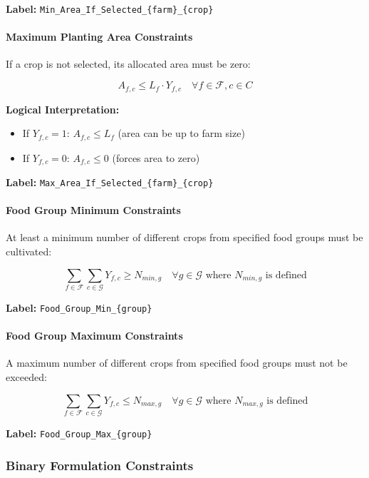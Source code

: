 \documentclass{article}
\begin{document}
\textbf{Label:} \texttt{Min\_Area\_If\_Selected\_\{farm\}\_\{crop\}}

\paragraph{Maximum Planting Area Constraints}

If a crop is not selected, its allocated area must be zero:

$$A_{f,c} \leq L_f \cdot Y_{f,c} \quad \forall f \in \mathcal{F}, c \in C$$


\textbf{Logical Interpretation:}
\begin{itemize}
    \item If $Y_{f,c} = 1$: $A_{f,c} \leq L_f$ (area can be up to farm size)
    \item If $Y_{f,c} = 0$: $A_{f,c} \leq 0$ (forces area to zero)
\end{itemize}

\textbf{Label:} \texttt{Max\_Area\_If\_Selected\_\{farm\}\_\{crop\}}

\paragraph{Food Group Minimum Constraints}

At least a minimum number of different crops from specified food groups must be cultivated:

$$\sum_{f \in \mathcal{F}}\sum_{c \in \mathcal{G}} Y_{f,c} \geq N_{min,g} \quad \forall g \in \mathcal{G} \text{ where } N_{min,g} \text{ is defined}$$

\textbf{Label:} \texttt{Food\_Group\_Min\_\{group\}}

\paragraph{Food Group Maximum Constraints}

A maximum number of different crops from specified food groups must not be exceeded:

$$\sum_{f \in \mathcal{F}}\sum_{c \in \mathcal{G}} Y_{f,c} \leq N_{max,g} \quad \forall g \in \mathcal{G} \text{ where } N_{max,g} \text{ is defined}$$

\textbf{Label:} \texttt{Food\_Group\_Max\_\{group\}}

\subsubsection{Binary Formulation Constraints}
\end{document}
